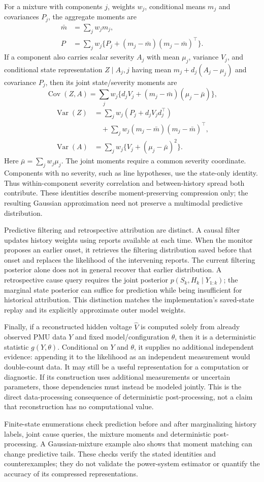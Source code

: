 For a mixture with components $j$, weights $w_j$, conditional means $m_j$
and covariances $P_j$, the aggregate moments are
\begin{align*}
 \bar m&=\sum_jw_jm_j,\\
 P&=\sum_jw_j\{P_j+(m_j-\bar m)(m_j-\bar m)^\top\}.
\end{align*}
If a component also carries scalar severity $A_j$ with mean $\mu_j$,
variance $V_j$, and conditional state representation
$Z\mid A_j,j$ having mean $m_j+d_j(A_j-\mu_j)$ and covariance $P_j$,
then its joint state/severity moments are
\[
 \operatorname{Cov}(Z,A)=\sum_jw_j\{d_jV_j+(m_j-\bar m)(\mu_j-\bar\mu)\},
\]
\begin{align*}
 \operatorname{Var}(Z)&=\sum_jw_j(P_j+d_jV_jd_j^\top)\\
 &\quad+\sum_jw_j(m_j-\bar m)(m_j-\bar m)^\top,\\
 \operatorname{Var}(A)&=\sum_jw_j\{V_j+(\mu_j-\bar\mu)^2\}.
\end{align*}
Here $\bar\mu=\sum_jw_j\mu_j$.
The joint moments require a common severity coordinate. Components with
no severity, such as line hypotheses, use the state-only identity.
Thus within-component severity correlation and between-history spread both
contribute. These identities describe moment-preserving compression only;
the resulting Gaussian approximation need not preserve a multimodal
predictive distribution.

Predictive filtering and retrospective attribution are distinct. A causal
filter updates history weights using reports available at each time. When the monitor proposes an earlier onset, it retrieves the filtering
distribution saved before that onset and replaces the likelihood of the
intervening reports. The current filtering posterior
alone does not in general recover that earlier distribution. A retrospective
cause query requires the joint posterior $p(S_k,H_k\mid Y_{1:k})$; the
marginal state posterior can suffice for prediction while being insufficient
for historical attribution. This distinction matches the implementation's saved-state replay and its explicitly
approximate outer model weights.

Finally, if a reconstructed hidden voltage $\widehat V$ is computed solely
from already observed PMU data $Y$ and fixed model/configuration $\theta$,
then it is a deterministic statistic $g(Y,\theta)$. Conditional on $Y$ and
$\theta$, it supplies no additional independent evidence: appending it to
the likelihood as an independent measurement would double-count data.
It may still be a useful representation for a computation or diagnostic.
If its construction uses additional measurements or uncertain parameters,
those dependencies must instead be modeled jointly. This is the direct
data-processing consequence of deterministic post-processing, not a claim
that reconstruction has no computational value.

Finite-state enumerations check prediction before and after marginalizing
history labels, joint cause queries, the mixture moments and deterministic
post-processing. A Gaussian-mixture example also shows that moment matching
can change predictive tails. These checks verify the stated identities and
counterexamples; they do not validate the power-system estimator or quantify
the accuracy of its compressed representations.
